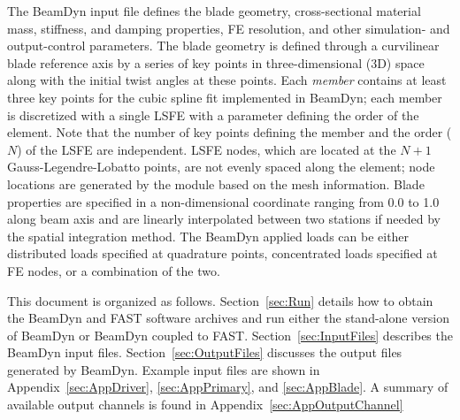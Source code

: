 The BeamDyn input file defines the blade geometry, cross-sectional material mass, stiffness, and damping properties, FE resolution, and other simulation- and output-control parameters. 
The blade geometry is defined through a curvilinear blade reference axis by a series of key points in three-dimensional (3D) space along with the initial twist angles at these points. 
Each \textit{member} contains at least three key points for the cubic spline fit implemented in BeamDyn; each member is discretized with a single LSFE with a parameter defining the order of the element. 
Note that the number of key points defining the member and the order ($N$) of the LSFE are independent.
LSFE nodes, which are located at the $N+1$ Gauss-Legendre-Lobatto points, are not evenly spaced along the element; node locations are generated by the module based on the mesh information. 
Blade properties are specified in a non-dimensional coordinate ranging from 0.0 to 1.0 along beam axis and are linearly interpolated between two stations if needed by the spatial integration method. 
The BeamDyn applied loads can be either distributed loads specified at quadrature points,  concentrated loads specified at FE nodes, or a combination of the two.  

This document is organized as follows. Section~\ref{sec:Run} details how to obtain the BeamDyn and FAST software archives and run either the stand-alone version of BeamDyn or BeamDyn coupled to FAST. Section~\ref{sec:InputFiles} describes the BeamDyn input files. Section~\ref{sec:OutputFiles} discusses the output files generated by BeamDyn. Example input files are shown in Appendix~\ref{sec:AppDriver}, \ref{sec:AppPrimary}, and  \ref{sec:AppBlade}. A summary of available output channels is found in Appendix~\ref{sec:AppOutputChannel}
